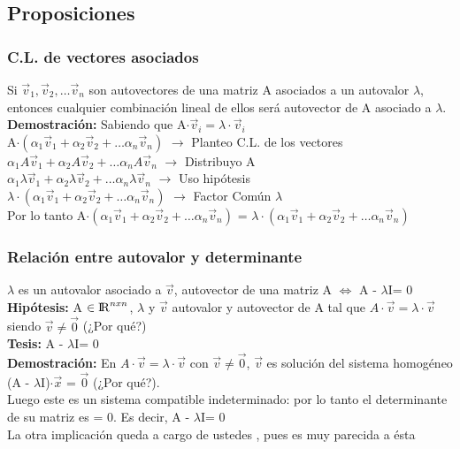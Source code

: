 \documentclass[11pt]{article}
\begin{document}
\subsection{Proposiciones}
\subsubsection{C.L. de vectores asociados}
Si $\vec{v}_1, \vec{v}_2, \ldots \vec{v}_n$ son autovectores de una matriz A asociados a un autovalor $\lambda$, entonces cualquier combinación lineal de ellos será autovector de A asociado a $\lambda$. \\
\textbf{Demostración:} Sabiendo que A$\cdot\vec{v}_i = \lambda\cdot\vec{v}_i$\\ 
A$\cdot( \alpha_1\vec{v}_1 + \alpha_2\vec{v}_2 + \ldots \alpha_n\vec{v}_n )$ $\rightarrow$ Planteo C.L. de los vectores\\ 
$ \alpha_1A\vec{v}_1 + \alpha_2A\vec{v}_2 + \ldots \alpha_nA\vec{v}_n$ $\rightarrow$ Distribuyo A\\
$ \alpha_1\lambda\vec{v}_1 + \alpha_2\lambda\vec{v}_2 + \ldots \alpha_n\lambda\vec{v}_n$  $\rightarrow$ Uso hipótesis\\
$\lambda \cdot(\alpha_1\vec{v}_1 + \alpha_2\vec{v}_2 + \ldots \alpha_n\vec{v}_n)$ $\rightarrow$ Factor Común $\lambda$\\
Por lo tanto A$\cdot( \alpha_1\vec{v}_1 + \alpha_2\vec{v}_2 + \ldots \alpha_n\vec{v}_n )$ = $\lambda \cdot(\alpha_1\vec{v}_1 + \alpha_2\vec{v}_2 + \ldots \alpha_n\vec{v}_n)$
\subsubsection{Relación entre autovalor y determinante}
$\lambda$ es un autovalor asociado a $\vec{v}$, autovector de una matriz A $\Leftrightarrow$ \textbar  A - $\lambda$I\textbar = 0\\
{\bfseries {Hipótesis:}} A $\in {\rm I\!R}^{nxn}$, $\lambda$ y $\vec{v}$ autovalor y autovector de A tal que $A\cdot\vec{v} = \lambda\cdot\vec{v}$ siendo $\vec{v} \neq \vec{0}$ (¿Por qué?)\\
{\bfseries {Tesis:}} \textbar  A - $\lambda$I\textbar = 0\\
\textbf{Demostración:} En $A\cdot\vec{v} = \lambda\cdot\vec{v}$ con  $\vec{v} \neq \vec{0}$, $\vec{v}$ es solución del sistema homogéneo (A - $\lambda$I)$\cdot\vec{x}$ = $\vec{0}$ (¿Por qué?).\\
Luego este es un sistema compatible indeterminado: por lo tanto el determinante de su matriz es = 0. Es decir, \textbar  A - $\lambda$I\textbar = 0\\
La otra implicación queda a cargo de ustedes ,
pues es muy parecida a ésta
\end{document}
